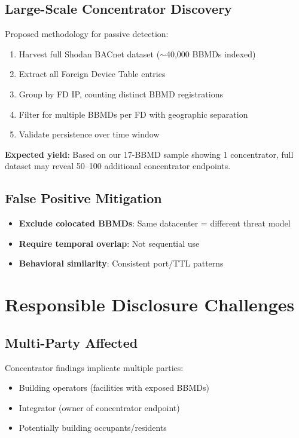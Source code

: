 \documentclass[11pt,a4paper]{article}
\begin{document}
\subsection{Large-Scale Concentrator Discovery}

Proposed methodology for passive detection:

\begin{enumerate}
  \item Harvest full Shodan BACnet dataset ($\sim$40,000 BBMDs indexed)
  \item Extract all Foreign Device Table entries
  \item Group by FD IP, counting distinct BBMD registrations
  \item Filter for multiple BBMDs per FD with geographic separation
  \item Validate persistence over time window
\end{enumerate}

\textbf{Expected yield}: Based on our 17-BBMD sample showing 1 concentrator, 
full dataset may reveal 50--100 additional concentrator endpoints.

\subsection{False Positive Mitigation}

\begin{itemize}
  \item \textbf{Exclude colocated BBMDs}: Same datacenter = different threat model
  \item \textbf{Require temporal overlap}: Not sequential use
  \item \textbf{Behavioral similarity}: Consistent port/TTL patterns
\end{itemize}

\section{Responsible Disclosure Challenges}
\label{sec:disclosure}

\subsection{Multi-Party Affected}

Concentrator findings implicate multiple parties:

\begin{itemize}
  \item Building operators (facilities with exposed BBMDs)
  \item Integrator (owner of concentrator endpoint)
  \item Potentially building occupants/residents
\end{itemize}
\end{document}
